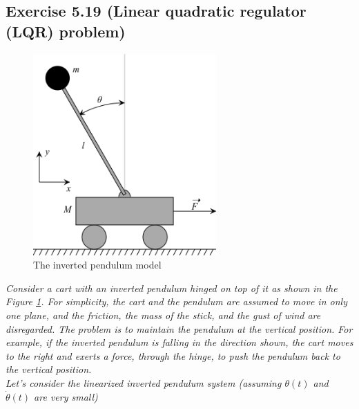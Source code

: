 \subsection{Exercise 5.19 (Linear quadratic regulator (LQR) problem)}

\begin{figure}
    \centering
    \includegraphics[width=7cm]{images/pendulum.png}
    \caption{The inverted pendulum model}
    \label{fig:pendulum}
\end{figure}

\emph{Consider a cart with an inverted pendulum hinged on top of it as shown in the Figure \ref{fig:pendulum}. For simplicity, the cart and the pendulum are assumed to move in only one plane, and the friction, the mass of the stick, and the gust of wind are disregarded. The problem is to maintain the pendulum at the vertical position. For example, if the inverted pendulum is falling in the direction shown, the cart moves to the right and exerts a force, through the hinge, to push the pendulum back to the vertical position.}\\
\emph{Let's consider the linearized inverted pendulum system (assuming $\theta(t)$ and $\Dot{\theta}(t)$ are very small)}

